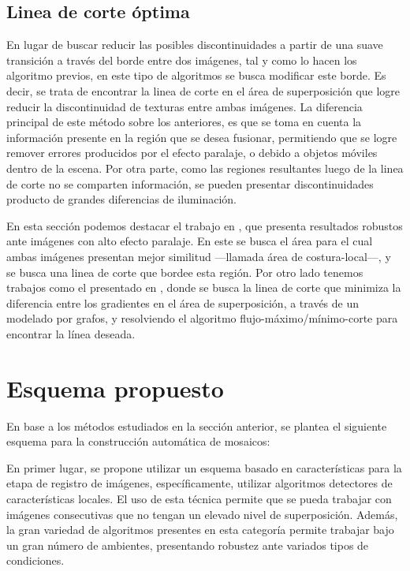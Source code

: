\subsection*{Linea de corte óptima}

En lugar de buscar reducir las posibles discontinuidades a partir de una suave transición a través del borde entre dos imágenes, tal y como lo hacen los algoritmo previos, en este tipo de algoritmos se busca modificar este borde. Es decir, se trata de encontrar la linea de corte en el área de superposición que logre reducir la discontinuidad de texturas entre ambas imágenes. La diferencia principal de este método sobre los anteriores, es que se toma en cuenta la información presente en la región que se desea fusionar, permitiendo que se logre remover errores producidos por el efecto paralaje, o debido a objetos móviles dentro de la escena. Por otra parte, como las regiones resultantes luego de la linea de corte no se comparten información, se pueden presentar discontinuidades producto de grandes diferencias de iluminación.

En esta sección podemos destacar el trabajo en \cite{zhang}, que presenta resultados robustos ante imágenes con alto efecto paralaje. En este se busca el área para el cual ambas imágenes presentan mejor similitud ---llamada área de costura-local---, y se busca una linea de corte que bordee esta región. Por otro lado tenemos trabajos como el presentado en \cite{watershed}, donde se busca la linea de corte que minimiza la diferencia entre los gradientes en el área de superposición, a través de un modelado por grafos, y resolviendo el algoritmo flujo-máximo/mínimo-corte \cite{maxflow} para encontrar la línea deseada.


\section{Esquema propuesto}

En base a los métodos estudiados en la sección anterior, se plantea el siguiente esquema para la construcción automática de mosaicos:

En primer lugar, se propone utilizar un esquema basado en características para la etapa de registro de imágenes, específicamente, utilizar algoritmos detectores de características locales. El uso de esta técnica permite que se pueda trabajar con imágenes consecutivas que no tengan un elevado nivel de superposición. Además, la gran variedad de algoritmos presentes en esta categoría permite trabajar bajo un gran número de ambientes, presentando robustez ante variados tipos de condiciones. 

